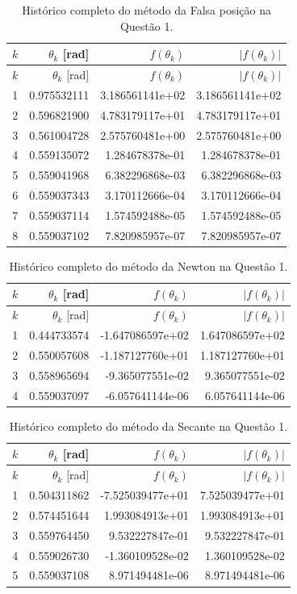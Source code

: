 \begin{longtable}{rrrr}
\caption{Histórico completo do método da Falsa posição na Questão 1.}\label{tab:iter-q1-2} \\
\toprule
$k$ & $\theta_k$ [rad] & $f(\theta_k)$ & $|f(\theta_k)|$ \\
\midrule
\endfirsthead
\toprule
$k$ & $\theta_k$ [rad] & $f(\theta_k)$ & $|f(\theta_k)|$ \\
\midrule
\endhead
1 & 0.975532111 & 3.186561141e+02 & 3.186561141e+02 \\
2 & 0.596821900 & 4.783179117e+01 & 4.783179117e+01 \\
3 & 0.561004728 & 2.575760481e+00 & 2.575760481e+00 \\
4 & 0.559135072 & 1.284678378e-01 & 1.284678378e-01 \\
5 & 0.559041968 & 6.382296868e-03 & 6.382296868e-03 \\
6 & 0.559037343 & 3.170112666e-04 & 3.170112666e-04 \\
7 & 0.559037114 & 1.574592488e-05 & 1.574592488e-05 \\
8 & 0.559037102 & 7.820985957e-07 & 7.820985957e-07 \\
\bottomrule
\end{longtable}

\begin{longtable}{rrrr}
\caption{Histórico completo do método da Newton na Questão 1.}\label{tab:iter-q1-3} \\
\toprule
$k$ & $\theta_k$ [rad] & $f(\theta_k)$ & $|f(\theta_k)|$ \\
\midrule
\endfirsthead
\toprule
$k$ & $\theta_k$ [rad] & $f(\theta_k)$ & $|f(\theta_k)|$ \\
\midrule
\endhead
1 & 0.444733574 & -1.647086597e+02 & 1.647086597e+02 \\
2 & 0.550057608 & -1.187127760e+01 & 1.187127760e+01 \\
3 & 0.558965694 & -9.365077551e-02 & 9.365077551e-02 \\
4 & 0.559037097 & -6.057641144e-06 & 6.057641144e-06 \\
\bottomrule
\end{longtable}

\begin{longtable}{rrrr}
\caption{Histórico completo do método da Secante na Questão 1.}\label{tab:iter-q1-4} \\
\toprule
$k$ & $\theta_k$ [rad] & $f(\theta_k)$ & $|f(\theta_k)|$ \\
\midrule
\endfirsthead
\toprule
$k$ & $\theta_k$ [rad] & $f(\theta_k)$ & $|f(\theta_k)|$ \\
\midrule
\endhead
1 & 0.504311862 & -7.525039477e+01 & 7.525039477e+01 \\
2 & 0.574451644 & 1.993084913e+01 & 1.993084913e+01 \\
3 & 0.559764450 & 9.532227847e-01 & 9.532227847e-01 \\
4 & 0.559026730 & -1.360109528e-02 & 1.360109528e-02 \\
5 & 0.559037108 & 8.971494481e-06 & 8.971494481e-06 \\
\bottomrule
\end{longtable}

